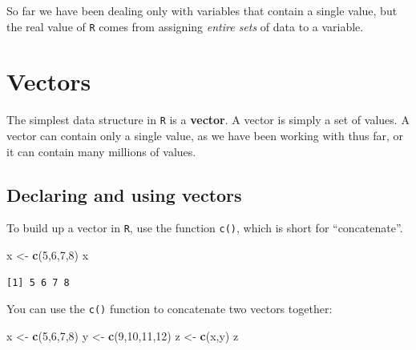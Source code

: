 \documentclass[
]{book}
\newenvironment{Shaded}{\begin{snugshade}}{\end{snugshade}}
\newcommand{\DecValTok}[1]{\textcolor[rgb]{0.00,0.00,0.81}{#1}}
\newcommand{\KeywordTok}[1]{\textcolor[rgb]{0.13,0.29,0.53}{\textbf{#1}}}
\newcommand{\NormalTok}[1]{#1}
\newcommand{\StringTok}[1]{\textcolor[rgb]{0.31,0.60,0.02}{#1}}
\begin{document}
So far we have been dealing only with variables that contain a single value, but the real value of \texttt{R} comes from assigning \emph{entire sets} of data to a variable.

\hypertarget{vectors}{%
\section*{Vectors}\label{vectors}}

The simplest data structure in \texttt{R} is a \textbf{vector}. A vector is simply a set of values. A vector can contain only a single value, as we have been working with thus far, or it can contain many millions of values.

\hypertarget{declaring-and-using-vectors}{%
\subsection*{Declaring and using vectors}\label{declaring-and-using-vectors}}

To build up a vector in \texttt{R}, use the function \texttt{c()}, which is short for ``concatenate''.

\begin{Shaded}
\begin{Highlighting}[]
\NormalTok{x <-}\StringTok{ }\KeywordTok{c}\NormalTok{(}\DecValTok{5}\NormalTok{,}\DecValTok{6}\NormalTok{,}\DecValTok{7}\NormalTok{,}\DecValTok{8}\NormalTok{)}
\NormalTok{x}
\end{Highlighting}
\end{Shaded}

\begin{verbatim}
[1] 5 6 7 8
\end{verbatim}

You can use the \texttt{c()} function to concatenate two vectors together:

\begin{Shaded}
\begin{Highlighting}[]
\NormalTok{x <-}\StringTok{ }\KeywordTok{c}\NormalTok{(}\DecValTok{5}\NormalTok{,}\DecValTok{6}\NormalTok{,}\DecValTok{7}\NormalTok{,}\DecValTok{8}\NormalTok{)}
\NormalTok{y <-}\StringTok{ }\KeywordTok{c}\NormalTok{(}\DecValTok{9}\NormalTok{,}\DecValTok{10}\NormalTok{,}\DecValTok{11}\NormalTok{,}\DecValTok{12}\NormalTok{)}
\NormalTok{z <-}\StringTok{ }\KeywordTok{c}\NormalTok{(x,y)}
\NormalTok{z}
\end{Highlighting}
\end{Shaded}
\end{document}
